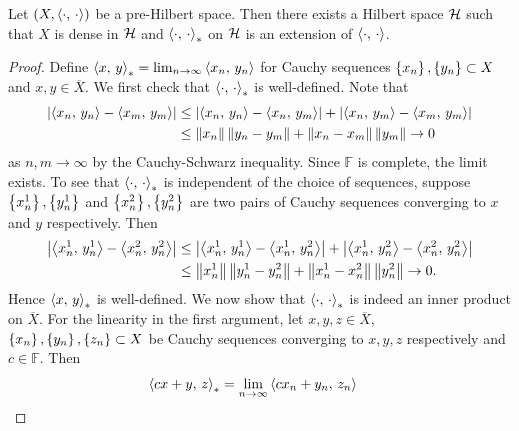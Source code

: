 \begin{theorem}
    Let $(X,\left\langle {\cdot},\, {\cdot} \right\rangle)$ be a pre-Hilbert space. Then there 
    exists a Hilbert space $\mathcal{H}$ such that $X$ is dense in $\mathcal{H}$ and 
    $\left\langle {\cdot},\, {\cdot} \right\rangle_*$ on $\mathcal{H}$ is an extension of $\left\langle {\cdot},\, {\cdot} \right\rangle$.
\end{theorem}
\begin{proof}
    Define $\left\langle {x},\, {y} \right\rangle_* = \lim_{n\to\infty}\left\langle {x_n},\, {y_n} \right\rangle$ for 
    Cauchy sequences $\left\{ {x_n} \right\},\left\{ {y_n} \right\}\subset X$ and $x,y\in\overline{X}$. 
    We first check that $\left\langle {\cdot},\, {\cdot} \right\rangle_*$ is well-defined. Note that 
    \begin{equation*}
        \begin{split}
            \left\lvert {\left\langle {x_n},\, {y_n} \right\rangle - \left\langle {x_m},\, {y_m} \right\rangle} \right\rvert 
            &\leq \left\lvert {\left\langle {x_n},\, {y_n} \right\rangle - \left\langle {x_n},\, {y_m} \right\rangle} \right\rvert + \left\lvert {\left\langle {x_n},\, {y_m} \right\rangle - \left\langle {x_m},\, {y_m} \right\rangle} \right\rvert \\
            &\leq \left\lVert {x_n} \right\rVert\left\lVert {y_n - y_m} \right\rVert + \left\lVert {x_n - x_m} \right\rVert\left\lVert {y_m} \right\rVert \to 0
        \end{split}
    \end{equation*}
    as $n,m\to\infty$ by the Cauchy-Schwarz inequality. Since $\mathbb{F}$ is 
    complete, the limit exists. To see that $\left\langle {\cdot},\, {\cdot} \right\rangle_*$ is 
    independent of the choice of sequences, suppose $\left\{ {x_n^1} \right\},\left\{ {y_n^1} \right\}$ 
    and $\left\{ {x_n^2} \right\},\left\{ {y_n^2} \right\}$ are two pairs of Cauchy sequences converging 
    to $x$ and $y$ respectively. Then 
    \begin{equation*}
        \begin{split}
            \left\lvert {\left\langle {x_n^1},\, {y_n^1} \right\rangle - \left\langle {x_n^2},\, {y_n^2} \right\rangle} \right\rvert 
            &\leq \left\lvert {\left\langle {x_n^1},\, {y_n^1} \right\rangle - \left\langle {x_n^1},\, {y_n^2} \right\rangle} \right\rvert + \left\lvert {\left\langle {x_n^1},\, {y_n^2} \right\rangle - \left\langle {x_n^2},\, {y_n^2} \right\rangle} \right\rvert \\
            &\leq \left\lVert {x_n^1} \right\rVert\left\lVert {y_n^1 - y_n^2} \right\rVert + \left\lVert {x_n^1 - x_n^2} \right\rVert\left\lVert {y_n^2} \right\rVert\to 0.
        \end{split}
    \end{equation*}
    Hence $\left\langle {x},\, {y} \right\rangle_*$ is well-defined. We now show that 
    $\left\langle {\cdot},\, {\cdot} \right\rangle_*$ is indeed an inner product on $\overline{X}$. 
    For the linearity in the first argument, let $x,y,z\in\overline{X}$, 
    $\left\{ {x_n} \right\},\left\{ {y_n} \right\},\left\{ {z_n} \right\}\subset X$ be Cauchy sequences converging to 
    $x,y,z$ respectively and $c\in\mathbb{F}$. Then 
    \begin{equation*}
        \begin{split}
            \inprod{cx+y}{z}_* &= \lim_{n\to\infty}\inprod{c x_n + y_n}{z_n} 

\end{split}
\end{equation*}
\end{proof}
